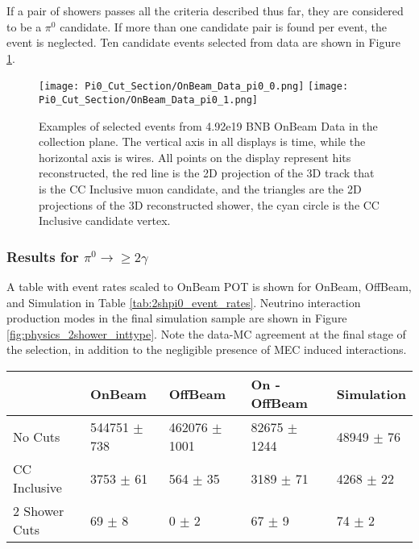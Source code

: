 \par If a pair of showers passes all the criteria described thus far, they are considered to be a $\pi^0$ candidate. If more than one candidate pair is found per event, the event is neglected.  Ten candidate events selected from data are shown in Figure \ref{fig:physics_pi0_onbeam_eventdisplays}.
\begin{figure}[h!]
\centering
\texttt{[image: Pi0\_Cut\_Section/OnBeam\_Data\_pi0\_0.png]}
\texttt{[image: Pi0\_Cut\_Section/OnBeam\_Data\_pi0\_1.png]}
\caption{ Examples of selected events from 4.92e19 BNB OnBeam Data in the collection plane. The vertical axis in all displays is time, while the horizontal axis is wires. All points on the display represent hits reconstructed, the red line is the 2D projection of the 3D track that is the CC Inclusive muon candidate, and the triangles are the 2D projections of the 3D reconstructed shower, the cyan circle is the CC Inclusive candidate vertex. }
\label{fig:physics_pi0_onbeam_eventdisplays}
\end{figure}

\clearpage
\subsubsection{Results for $\pi^0\rightarrow \geq 2 \gamma$}
\par A table with event rates scaled to OnBeam POT is shown for OnBeam, OffBeam, and Simulation in Table \ref{tab:2shpi0_event_rates}. Neutrino interaction production modes in the final simulation sample are shown in Figure \ref{fig:physics_2shower_inttype}. Note the data-MC agreement at the final stage of the selection, in addition to the negligible presence of MEC induced interactions. 

\begin{table}[H] 
 \centering
 \begin{tabular}{| l | l | l | l | l |}
  \hline
   & OnBeam & OffBeam & On - OffBeam & Simulation \\ [0.1ex] \hline
No Cuts & 544751 $\pm$ 738 & 462076 $\pm$ 1001 & 82675 $\pm$ 1244 & 48949 $\pm$ 76 \\ 
CC Inclusive & 3753 $\pm$ 61 & 564 $\pm$ 35 & 3189 $\pm$ 71 & 4268 $\pm$ 22 \\ 
2 Shower Cuts & 69 $\pm$ 8 & 0 $\pm$ 2 & 67 $\pm$ 9 & 74 $\pm$ 2  \\ \hline
\end{tabular}
 \end{table}



